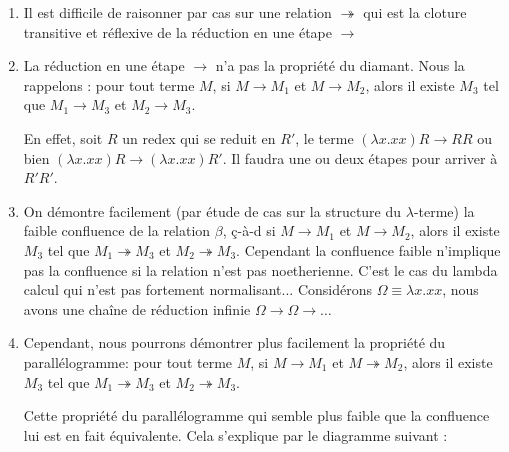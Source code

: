 \documentclass[11pt]{book}
\begin{document}
\begin{enumerate}
	\item Il est difficile de raisonner par cas sur une relation $\twoheadrightarrow $
	 qui est la cloture transitive
	 et réflexive de la réduction en une étape $\rightarrow$

	\item La réduction en une étape $\rightarrow$ n'a pas la propriété du diamant. Nous la rappelons : pour tout terme $M$,
	 si $M\rightarrow  M_1$ et  $M\rightarrow M_2$,
alors il existe $M_3$ tel que $M_1\rightarrow M_3$ et  $M_2\rightarrow M_3$.

En effet, soit $R$ un redex qui se reduit en $R'$, le terme $(\lambda x.xx) R \rightarrow RR$ ou bien 
 $(\lambda x.xx) R \rightarrow (\lambda x.xx) R'$. Il faudra une ou deux étapes pour arriver à $R'R'$. 

 \item On démontre facilement (par étude de cas sur la structure du $\lambda$-terme) 
 la faible confluence de la relation $\beta$, ç-à-d si $M \rightarrow M_1$ et $M \rightarrow M_2$, alors
 il existe $M_3$ tel que $M_1 \twoheadrightarrow M_3$ et $M_2 \twoheadrightarrow M_3$.
 Cependant la confluence faible n'implique pas la confluence si la relation n'est pas noetherienne.
 C'est le cas du lambda calcul qui n'est pas fortement normalisant... 
Considérons $\Omega \equiv \lambda x.xx $, nous avons une chaîne de réduction infinie $\Omega \rightarrow \Omega \rightarrow \dots $

 \item Cependant, nous pourrons démontrer plus facilement la propriété du parallélogramme: pour tout terme $M$,
  si $M\rightarrow M_1$ et  $M\twoheadrightarrow  M_2$,
alors il existe $M_3$ tel que $M_1\twoheadrightarrow  M_3$ et  $M_2\twoheadrightarrow M_3$.

Cette propriété du parallélogramme qui semble plus faible que la confluence lui est en fait équivalente. Cela
s'explique par le diagramme suivant :

\begin{center}
\end{center}
\end{enumerate}
\end{document}
